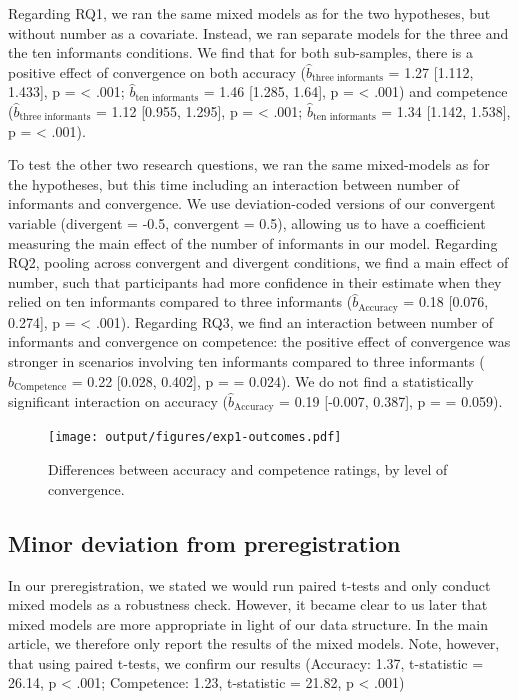 \documentclass[
  doc,floatsintext]{apa6}
\begin{document}
Regarding RQ1, we ran the same mixed models as for the two hypotheses, but without number as a covariate. Instead, we ran separate models for the three and the ten informants conditions. We find that for both sub-samples, there is a positive effect of convergence on both accuracy (\(\hat{b}_{\text{three informants}}\) = 1.27 {[}1.112, 1.433{]}, p = \textless{} .001; \(\hat{b}_{\text{ten informants}}\) = 1.46 {[}1.285, 1.64{]}, p = \textless{} .001) and competence (\(\hat{b}_{\text{three informants}}\) = 1.12 {[}0.955, 1.295{]}, p = \textless{} .001; \(\hat{b}_{\text{ten informants}}\) = 1.34 {[}1.142, 1.538{]}, p = \textless{} .001).

To test the other two research questions, we ran the same mixed-models as for the hypotheses, but this time including an interaction between number of informants and convergence. We use deviation-coded versions of our convergent variable (divergent = -0.5, convergent = 0.5), allowing us to have a coefficient measuring the main effect of the number of informants in our model. Regarding RQ2, pooling across convergent and divergent conditions, we find a main effect of number, such that participants had more confidence in their estimate when they relied on ten informants compared to three informants (\(\hat{b}_{\text{Accuracy}}\) = 0.18 {[}0.076, 0.274{]}, p = \textless{} .001). Regarding RQ3, we find an interaction between number of informants and convergence on competence: the positive effect of convergence was stronger in scenarios involving ten informants compared to three informants (\(\hat{b}_{\text{Competence}}\) = 0.22 {[}0.028, 0.402{]}, p = = 0.024). We do not find a statistically significant interaction on accuracy (\(\hat{b}_{\text{Accuracy}}\) = 0.19 {[}-0.007, 0.387{]}, p = = 0.059).



\begin{figure}
\centering
\texttt{[image: output/figures/exp1-outcomes.pdf]}
\caption{\label{fig:exp1-outcomes}Differences between accuracy and competence ratings, by level of convergence.}
\end{figure}

\subsection{Minor deviation from preregistration}\label{minor-deviation-from-preregistration}

In our preregistration, we stated we would run paired t-tests and only conduct mixed models as a robustness check. However, it became clear to us later that mixed models are more appropriate in light of our data structure. In the main article, we therefore only report the results of the mixed models. Note, however, that using paired t-tests, we confirm our results (Accuracy: 1.37, t-statistic = 26.14, p \textless{} .001; Competence: 1.23, t-statistic = 21.82, p \textless{} .001)
\end{document}
